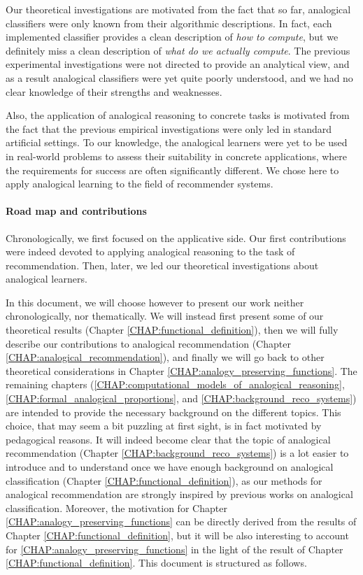 Our theoretical investigations are motivated from the fact that so far,
analogical classifiers were only known from their algorithmic descriptions.
In fact, each implemented classifier provides a clean description
of {\it how to compute}, but we definitely miss a clean description of {\it
what do we actually compute}. The previous experimental investigations were not
directed to provide an analytical view, and as a result analogical classifiers
were yet quite poorly understood, and we had no clear knowledge of their
strengths and weaknesses.

Also, the application of analogical reasoning to concrete tasks is motivated
from the fact that the previous empirical investigations were only led in
standard artificial settings. To our knowledge, the analogical learners were yet
to be used in real-world problems to assess their suitability in concrete
applications, where the requirements for success are often significantly
different. We chose here to apply analogical learning to the field of
recommender systems.

\paragraph{Road map and contributions\\}

Chronologically, we first focused on the applicative side. Our first
contributions were indeed devoted to applying analogical reasoning to the task
of recommendation. Then, later, we led our theoretical investigations about
analogical learners.

In this document, we will choose however to present our work neither
chronologically, nor thematically. We will instead first present some of our
theoretical results (Chapter \ref{CHAP:functional_definition}), then we will
fully describe our contributions to analogical recommendation (Chapter
\ref{CHAP:analogical_recommendation}), and finally we will go back to other
theoretical considerations in Chapter \ref{CHAP:analogy_preserving_functions}.
The remaining chapters
(\ref{CHAP:computational_models_of_analogical_reasoning},
\ref{CHAP:formal_analogical_proportions}, and
\ref{CHAP:background_reco_systems}) are intended to provide the necessary
background on the different topics. This choice, that may seem a bit puzzling
at first sight, is in fact motivated by pedagogical reasons. It will indeed
become clear that the topic of analogical recommendation (Chapter
\ref{CHAP:background_reco_systems}) is a lot easier to
introduce and to understand once we have enough background on analogical
classification (Chapter \ref{CHAP:functional_definition}), as our methods for
analogical recommendation are strongly inspired by previous works on analogical
classification. Moreover, the motivation for Chapter
\ref{CHAP:analogy_preserving_functions} can be directly derived from the
results of Chapter \ref{CHAP:functional_definition}, but it will be also
interesting to account for \ref{CHAP:analogy_preserving_functions} in the light
of the result of Chapter \ref{CHAP:functional_definition}.
This document is structured as follows.\\

